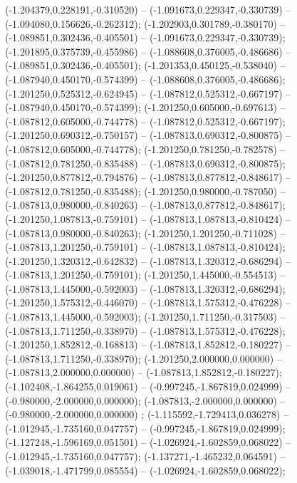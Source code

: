  (-1.204379,0.228191,-0.310520) -- (-1.091673,0.229347,-0.330739) -- (-1.094080,0.156626,-0.262312);
 (-1.202903,0.301789,-0.380170) -- (-1.089851,0.302436,-0.405501) -- (-1.091673,0.229347,-0.330739);
 (-1.201895,0.375739,-0.455986) -- (-1.088608,0.376005,-0.486686) -- (-1.089851,0.302436,-0.405501);
 (-1.201353,0.450125,-0.538040) -- (-1.087940,0.450170,-0.574399) -- (-1.088608,0.376005,-0.486686);
 (-1.201250,0.525312,-0.624945) -- (-1.087812,0.525312,-0.667197) -- (-1.087940,0.450170,-0.574399);
 (-1.201250,0.605000,-0.697613) -- (-1.087812,0.605000,-0.744778) -- (-1.087812,0.525312,-0.667197);
 (-1.201250,0.690312,-0.750157) -- (-1.087813,0.690312,-0.800875) -- (-1.087812,0.605000,-0.744778);
 (-1.201250,0.781250,-0.782578) -- (-1.087812,0.781250,-0.835488) -- (-1.087813,0.690312,-0.800875);
 (-1.201250,0.877812,-0.794876) -- (-1.087813,0.877812,-0.848617) -- (-1.087812,0.781250,-0.835488);
 (-1.201250,0.980000,-0.787050) -- (-1.087813,0.980000,-0.840263) -- (-1.087813,0.877812,-0.848617);
 (-1.201250,1.087813,-0.759101) -- (-1.087813,1.087813,-0.810424) -- (-1.087813,0.980000,-0.840263);
 (-1.201250,1.201250,-0.711028) -- (-1.087813,1.201250,-0.759101) -- (-1.087813,1.087813,-0.810424);
 (-1.201250,1.320312,-0.642832) -- (-1.087813,1.320312,-0.686294) -- (-1.087813,1.201250,-0.759101);
 (-1.201250,1.445000,-0.554513) -- (-1.087813,1.445000,-0.592003) -- (-1.087813,1.320312,-0.686294);
 (-1.201250,1.575312,-0.446070) -- (-1.087813,1.575312,-0.476228) -- (-1.087813,1.445000,-0.592003);
 (-1.201250,1.711250,-0.317503) -- (-1.087813,1.711250,-0.338970) -- (-1.087813,1.575312,-0.476228);
 (-1.201250,1.852812,-0.168813) -- (-1.087813,1.852812,-0.180227) -- (-1.087813,1.711250,-0.338970);
 (-1.201250,2.000000,0.000000) -- (-1.087813,2.000000,0.000000) -- (-1.087813,1.852812,-0.180227);
 (-1.102408,-1.864255,0.019061) -- (-0.997245,-1.867819,0.024999) -- (-0.980000,-2.000000,0.000000);
 (-1.087813,-2.000000,0.000000) -- (-0.980000,-2.000000,0.000000) ;
 (-1.115592,-1.729413,0.036278) -- (-1.012945,-1.735160,0.047757) -- (-0.997245,-1.867819,0.024999);
 (-1.127248,-1.596169,0.051501) -- (-1.026924,-1.602859,0.068022) -- (-1.012945,-1.735160,0.047757);
 (-1.137271,-1.465232,0.064591) -- (-1.039018,-1.471799,0.085554) -- (-1.026924,-1.602859,0.068022);
